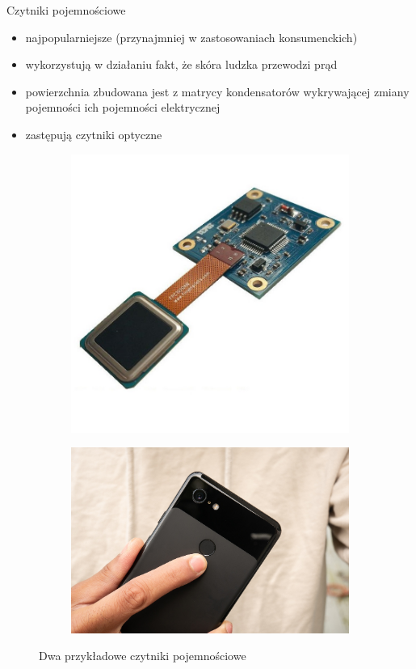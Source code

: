 \documentclass{beamer}
\begin{document}
\begin{frame}{Czytniki pojemnościowe}
    \begin{itemize}
        \item najpopularniejsze (przynajmniej w zastosowaniach konsumenckich)
        \item wykorzystują w działaniu fakt, że skóra ludzka przewodzi prąd
        \item powierzchnia zbudowana jest z matrycy kondensatorów wykrywającej zmiany pojemności ich pojemności elektrycznej
        \item zastępują czytniki optyczne
    \end{itemize}
    \medskip
    \begin{figure}
        \centering
        \begin{subfigure}{.49\textwidth}
            \centering
            \includegraphics[width=0.5\linewidth]{types/CAMA-AFM31-USB-Capacitive-Fingerprint-Module-with-FPC1020-Fingerprint-Sensor-Arduino-01.jpg}
        \end{subfigure}
        \begin{subfigure}{.49\textwidth}
            \centering
            \includegraphics[width=0.7\linewidth]{types/Google-Pixel-3-and-Pixel-3-XL-users-are-now-facing-fingerprint-gesture-inconsistencies.jpg}
        \end{subfigure}
        \caption{Dwa przykładowe czytniki pojemnościowe}
    \end{figure}
\end{frame}
\end{document}
